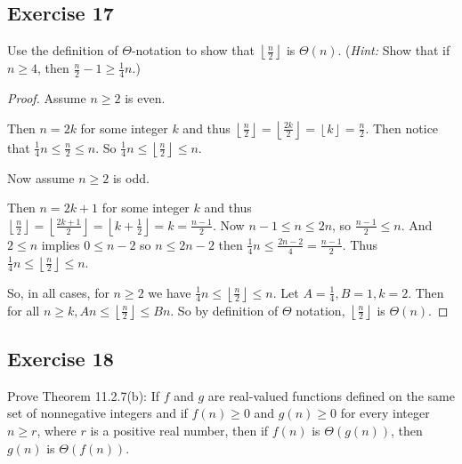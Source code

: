 \documentclass[14pt]{extarticle}
\newcommand{\dps}{\displaystyle}
\newcommand{\floor}[1]{{\left\lfloor#1\right\rfloor}}
\begin{document}
\subsection{Exercise 17}
Use the definition of \(\Theta\)-notation to show that \(\dps \floor{\frac{n}{2}}\) is \(\Theta(n)\). ({\it Hint:} Show
that if \(n \geq 4\), then \(\dps \frac{n}{2} - 1 \geq \frac{1}{4}n\).)

\begin{proof}
    Assume \(n \geq 2\) is even.

    Then \(n = 2k\) for some integer \(k\) and thus \(\dps \floor{\frac{n}{2}} = \floor{\frac{2k}{2}} = \floor{k} =
    \frac{n}{2}\). Then notice that \(\dps \frac{1}{4}n \leq \frac{n}{2} \leq n\). So \(\dps \frac{1}{4}n \leq
    \floor{\frac{n}{2}} \leq n\).

    Now assume \(n \geq 2\) is odd.

    Then \(n = 2k+1\) for some integer \(k\) and thus \(\dps \floor{\frac{n}{2}} = \floor{\frac{2k+1}{2}} = \floor{k +
        \frac{1}{2}} = k = \frac{n-1}{2}\). Now \(n-1 \leq n \leq 2n\), so \(\dps \frac{n-1}{2} \leq n\). And \(2 \leq n\)
    implies \(0 \leq n-2\) so \(n \leq 2n - 2\) then \(\dps \frac{1}{4}n \leq \frac{2n-2}{4} = \frac{n-1}{2}\). Thus
    \(\dps \frac{1}{4}n \leq \floor{\frac{n}{2}} \leq n\).

    So, in all cases, for \(n \geq 2\) we have \(\dps \frac{1}{4}n \leq \floor{\frac{n}{2}} \leq n\). Let \(A = \frac{1}{4},
    B = 1, k = 2\). Then for all \(\dps n \geq k, An \leq \floor{\frac{n}{2}} \leq Bn\). So by definition of \(\Theta\)
    notation, \(\dps \floor{\frac{n}{2}}\) is \(\Theta(n)\).
\end{proof}

\subsection{Exercise 18}
Prove Theorem 11.2.7(b): If \(f\) and \(g\) are real-valued functions defined on the same set of nonnegative integers and
if \(f(n) \geq 0\) and \(g(n) \geq 0\) for every integer \(n \geq r\), where \(r\) is a positive real number, then if
\(f(n)\) is \(\Theta(g(n))\), then \(g(n)\) is \(\Theta(f(n))\).
\end{document}
